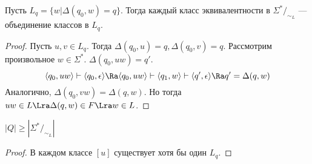 \begin{lemma}
    Пусть \(L_q = \{w | \Delta(q_0, w) = q\}\). Тогда каждый класс эквивалентности в \(\Sigma^*/_{\sim_L}\) --- объединение классов в \(L_q\).
\end{lemma}
\begin{proof}
    Пусть \(u, v \in L_q\). Тогда \(\Delta(q_0, u) = q, \Delta(q_0, v) = q\). Рассмотрим произвольное \(w \in \Sigma^*\). \(\Delta(q_0, uw) = q'\).
    \[\langle q_0, uw \rangle \vdash \langle q_0, \epsilon \rangle  \Ra \langle q_0, uw \rangle \vdash \langle q_1, w \rangle \vdash \langle q', \epsilon \rangle \Ra q' = \Delta(q, w)\]
    Аналогично, \(\Delta(q_0, vw) = \Delta(q, w)\). Но тогда \(uw \in L \Lra \Delta(q, w) \in F \Lra w \in L\).
\end{proof}
\begin{corollary}
    \(|Q| \ge |\Sigma^*/_{\sim_L}|\)
\end{corollary}
\begin{proof}
    В каждом классе \([u]\) существует хотя бы один \(L_q\).
\end{proof}

